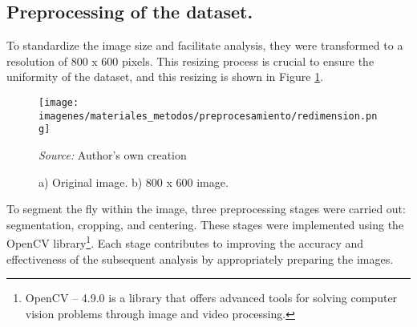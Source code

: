 \subsection{Preprocessing of the dataset.}
To standardize the image size and facilitate analysis, they were transformed to a resolution of 800 x 600 pixels. This resizing process is crucial to ensure the uniformity of the dataset, and this resizing is shown in Figure \ref{fig:redimension}.

\begin{figure}[htbp]
    \centering
    \texttt{[image: imagenes/materiales\_metodos/preprocesamiento/redimension.png]}
    \caption{a) Original image. b) 800 x 600 image.}
    \scriptsize \textit{Source:} Author's own creation
    \label{fig:redimension}
\end{figure}

To segment the fly within the image, three preprocessing stages were carried out: segmentation, cropping, and centering. These stages were implemented using the OpenCV library\footnote{OpenCV – 4.9.0 is a library that offers advanced tools for solving computer vision problems through image and video processing.}. Each stage contributes to improving the accuracy and effectiveness of the subsequent analysis by appropriately preparing the images.

